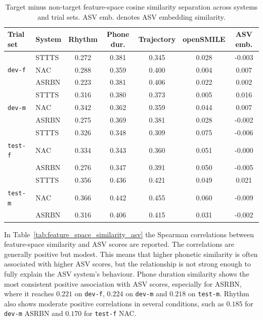 \documentclass[12pt,leqno,a4paper]{article}
\begin{document}
\begin{table}[H]
\centering
\small
\begin{tabular}{llccccc}
\hline
Trial set & System & Rhythm & Phone dur. & Trajectory & openSMILE & ASV emb. \\
\hline
 & STTTS & 0.272 & \color{darkgreen}0.381 & 0.345 & 0.028 & -0.003 \\
\texttt{dev-f}  & NAC   & 0.288 & 0.359 & \color{darkgreen}0.400 & 0.004 & 0.007 \\
  & ASRBN & 0.223 & 0.381 & \color{darkgreen}0.406 & 0.022 & 0.002 \\
\hline
 & STTTS & 0.316 & \color{darkgreen}0.380 & 0.373 & 0.005 & 0.016 \\
\texttt{dev-m}  & NAC   & 0.342 & \color{darkgreen}0.362 & 0.359 & 0.044 & 0.007 \\
  & ASRBN & 0.275 & 0.369 & \color{darkgreen}0.381 & 0.028 & -0.002 \\
\hline
& STTTS & 0.326 & \color{darkgreen}0.348 & 0.309 & 0.075 & -0.006 \\
\texttt{test-f} & NAC   & 0.334 & 0.343 & \color{darkgreen}0.360 & 0.051 & -0.000 \\
 & ASRBN & 0.276 & 0.347 & \color{darkgreen}0.391 & 0.050 & -0.005 \\

\hline
 & STTTS & 0.356 & \color{darkgreen}0.436 & 0.421 & 0.049 & 0.021 \\
\texttt{test-m} & NAC   & 0.366 & 0.442 & \color{darkgreen}0.455 & 0.060 & -0.009 \\
 & ASRBN & 0.316 & 0.406 & \color{darkgreen}0.415 & 0.031 & -0.002 \\
\hline
\end{tabular}
\caption{Target minus non-target feature-space cosine similarity separation across systems and trial sets. ASV emb. denotes ASV embedding similarity.}
\label{tab:feature_space_target_non_separation}
\end{table}

In Table~\ref{tab:feature_space_similarity_asv} the Spearman correlations between feature-space similarity and ASV scores are reported. The correlations are generally positive but modest. This means that higher phonetic similarity is often associated with higher ASV scores, but the relationship is not strong enough to fully explain the ASV system's behaviour.
Phone duration similarity shows the most consistent positive association with ASV scores, especially for ASRBN, where it reaches $0.221$ on \texttt{dev-f}, $0.224$ on \texttt{dev-m} and $0.218$ on \texttt{test-m}. Rhythm also shows moderate positive correlations in several conditions, such as $0.185$ for \texttt{dev-m} ASRBN and $0.170$ for \texttt{test-f} NAC.
\end{document}
